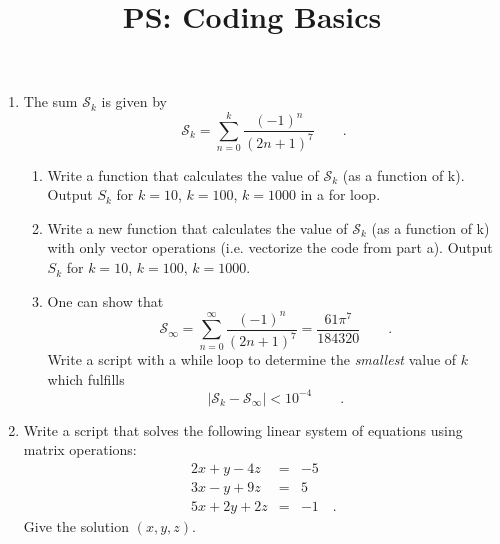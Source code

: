 \documentclass{article}
\title{\vspace{-1in} PS: Coding Basics}
\date{}
\newcommand{\beq}{\begin{equation*}}
\newcommand{\eeq}{\end{equation*}}
\newcommand{\be}{\begin{enumerate}}
\newcommand{\ee}{\end{enumerate}}
\begin{document}
\maketitle

\be
 \item The sum $\mathcal{S}_k$ is given by
\beq
\mathcal{S}_k= 
\sum_{n=0}^k \frac{(-1)^n}{(2n+1)^7}\qquad .
\eeq

\be
\item Write a function that calculates the value of $\mathcal{S}_k$ (as a function of k). Output $S_k$ for $k=10$, $k=100$, $k=1000$ in a for loop. 
\item Write a new function that calculates the value of $\mathcal{S}_k$ (as a function of k) with only vector operations (i.e. vectorize the code from part a). Output $S_k$ for $k=10$, $k=100$, $k=1000$. 
\item One can show that
\beq
\mathcal{S}_\infty= 
\sum_{n=0}^\infty\frac{(-1)^n}{(2n+1)^7}=\frac{61\pi^7}{184320}\qquad .
\eeq
Write a script with a while loop to determine the \emph{smallest} value of $k$ which fulfills 
\beq
\left|\mathcal{S}_k-\mathcal{S}_\infty \right|< 10^{-4}\qquad.
\eeq
\ee
\item Write a script that solves the following linear system of equations using matrix operations:
\begin{eqnarray*}
2x+y-4z & = & -5 \\
3x-y+9z &=& 5\\
5x+2y + 2z &=& -1\quad .
\end{eqnarray*}
Give the solution $(x,y,z)$.


\ee 
\end{document}
